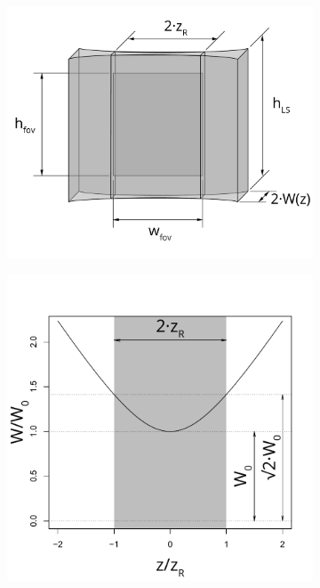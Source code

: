     \begin{figure}
      \centering
      \begin{subfigure}[b]{0.39\textwidth}
          \centering
          \includegraphics[width=\textwidth]{FOV}
          \caption{}
          \label{fig:fov}
      \end{subfigure}
      \begin{subfigure}[b]{0.29\textwidth}
          \centering
          \includegraphics[width=\textwidth]{width}

\end{subfigure}
\end{figure}

